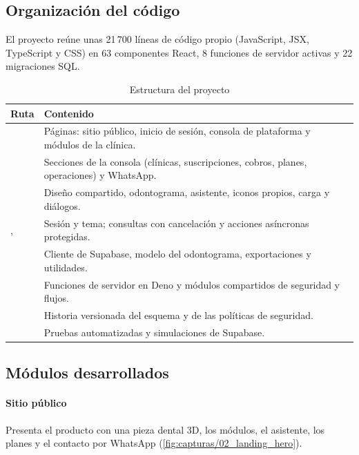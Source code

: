 \documentclass[11pt]{article}
\begin{document}
\subsection{Organización del código}

El proyecto reúne unas 21\,700 líneas de código propio (JavaScript, JSX, TypeScript y CSS) en 63 componentes React, 8 funciones de servidor activas y 22 migraciones SQL.

\begin{table}[H]
\centering\small
\caption{Estructura del proyecto}\label{tab:estructura}
\begin{tabularx}{\linewidth}{@{}P{4.4cm}L@{}}
\toprule
\textbf{Ruta} & \textbf{Contenido} \\
\midrule
{} & Páginas: sitio público, inicio de sesión, consola de plataforma y módulos de la clínica. \\
 & Secciones de la consola (clínicas, suscripciones, cobros, planes, operaciones) y WhatsApp. \\
 & Diseño compartido, odontograma, asistente, iconos propios, carga y diálogos. \\
,  & Sesión y tema; consultas con cancelación y acciones asíncronas protegidas. \\
 & Cliente de Supabase, modelo del odontograma, exportaciones y utilidades. \\
 & Funciones de servidor en Deno y módulos compartidos de seguridad y flujos. \\
 & Historia versionada del esquema y de las políticas de seguridad. \\
 & Pruebas automatizadas y simulaciones de Supabase. \\
\bottomrule
\end{tabularx}
\end{table}

\subsection{Módulos desarrollados}

\paragraph{Sitio público} Presenta el producto con una pieza dental 3D, los módulos, el asistente, los planes y el contacto por WhatsApp (\cref{fig:capturas/02_landing_hero}).
\end{document}
